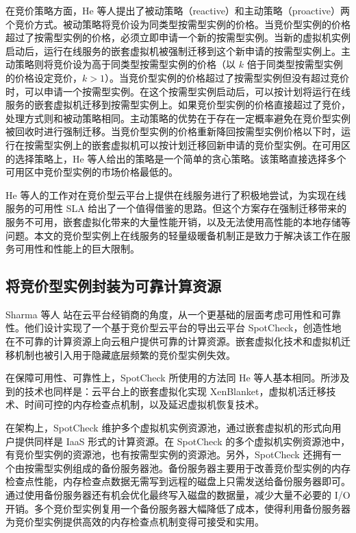 在竞价策略方面，He 等人提出了被动策略（reactive）和主动策略（proactive）两个竞价方式。被动策略将竞价设为同类型按需型实例的价格。当竞价型实例的价格超过了按需型实例的价格，必须立即申请一个新的按需型实例。当新的虚拟机实例启动后，运行在线服务的嵌套虚拟机被强制迁移到这个新申请的按需型实例上。主动策略则将竞价设为高于同类型按需型实例的价格（以 $k$ 倍于同类型按需型实例的价格设定竞价，$k > 1$）。当竞价型实例的价格超过了按需型实例但没有超过竞价时，可以申请一个按需型实例。在这个按需型实例启动后，可以按计划将运行在线服务的嵌套虚拟机迁移到按需型实例上。如果竞价型实例的价格直接超过了竞价，处理方式则和被动策略相同。主动策略的优势在于存在一定概率避免在竞价型实例被回收时进行强制迁移。当竞价型实例的价格重新降回按需型实例价格以下时，运行在按需型实例上的嵌套虚拟机可以按计划迁移回新申请的竞价型实例。在可用区的选择策略上，He 等人给出的策略是一个简单的贪心策略。该策略直接选择多个可用区中竞价型实例的市场价格最低的。

He 等人的工作对在竞价型云平台上提供在线服务进行了积极地尝试，为实现在线服务的可用性 SLA 给出了一个值得借鉴的思路。但这个方案存在强制迁移带来的服务不可用，嵌套虚拟化带来的大量性能开销，以及无法使用高性能的本地存储等问题。本文的竞价型实例上在线服务的轻量级暖备机制正是致力于解决该工作在服务可用性和性能上的巨大限制。

\subsection{将竞价型实例封装为可靠计算资源}
Sharma 等人 \cite{Sharma:2015:SDD:2741948.2741953} 站在云平台经销商的角度，从一个更基础的层面考虑可用性和可靠性。他们设计实现了一个基于竞价型云平台的导出云平台 SpotCheck，创造性地在不可靠的计算资源上向云租户提供可靠的计算资源。嵌套虚拟化技术和虚拟机迁移机制也被引入用于隐藏底层频繁的竞价型实例失效。

在保障可用性、可靠性上，SpotCheck 所使用的方法同 He 等人基本相同。所涉及到的技术也同样是：云平台上的嵌套虚拟化实现 XenBlanket，虚拟机活迁移技术、时间可控的内存检查点机制，以及延迟虚拟机恢复技术。

在架构上，SpotCheck 维护多个虚拟机实例资源池，通过嵌套虚拟机的形式向用户提供同样是 IaaS 形式的计算资源。在 SpotCheck 的多个虚拟机实例资源池中，有竞价型实例的资源池，也有按需型实例的资源池。另外，SpotCheck 还拥有一个由按需型实例组成的备份服务器池。备份服务器主要用于改善竞价型实例的内存检查点性能，内存检查点数据无需写到远程的磁盘上只需发送给备份服务器即可。通过使用备份服务器还有机会优化最终写入磁盘的数据量，减少大量不必要的 I/O 开销。多个竞价型实例复用一个备份服务器大幅降低了成本，使得利用备份服务器为竞价型实例提供高效的内存检查点机制变得可接受和实用。

